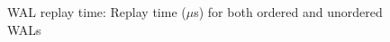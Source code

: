 \begin{figure}[!ht]
    \hspace*{-0.075\textwidth} %
    \raggedleft
    \caption{ WAL replay time: Replay time ($\mu$s) for both ordered and unordered WALs }
    \label{fig:walreplay}
\end{figure}

